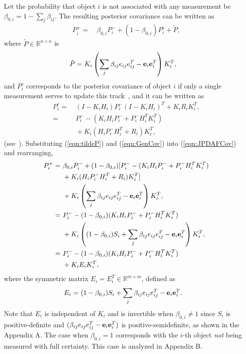 \documentclass[letterpaper, 10pt, conference]{ieeeconf}
\newcommand{\refeqn}[1]{(\ref{eqn:#1})}
\renewcommand{\Re}{\ensuremath{\mathbb{R}}}
\begin{document}
Let the probability that object $i$ is not associated with any measurement be $\beta_{0,i}=1-{\sum\limits_{j} \beta_{ij}}$.
The resulting posterior covariance can be written as
\begin{align}
\label{eqn:JPDAFCov}
P^+_{i}=&\ \beta_{0,i}P^-_{i}+(1-\beta_{0,i})P_i^c+\tilde P,
\end{align}
where $\tilde P\in\Re^{n\times n}$ is
\begin{align}
\tilde P=&\ K_i\left({\sum\limits_{j} \beta_{ij}e_{ij}e_{ij}^T-{\bf{e}}_{i}}{\bf{e}}_{i}^T\right)K_{i}^T,\label{eqn:tildeP}
\end{align}
and $P_i^c$ corresponds to the posterior covariance of object $i$ if only a single measurement serves to update this track~\cite{TrackDataAssoc}, and it can be written as
\begin{align}
P^c_i=&\ (I-K_iH_i)P^-_i(I-K_iH_i)^T+K_iR_iK_i^T,\nonumber
\\
=&\ P^-_i-(K_iH_iP^-_i+P^-_iH_i^TK_i^T)\nonumber
\\
&\ +K_i(H_iP^-_iH_i^T+R_i)K_i^T,
\label{eqn:GenCov}
\end{align}
(see~\cite{OptEst1}).
Substituting \refeqn{tildeP} and \refeqn{GenCov} into \refeqn{JPDAFCov} and rearranging,
\begin{align}
P^+_{i}=&\ \beta_{0,i}P^-_{i}+(1-\beta_{0,i})[P^-_i-(K_iH_iP^-_i+P^-_iH_i^TK_i^T)\nonumber
\\
&\ +K_i(H_iP^-_iH_i^T+R_i)K_i^T]\nonumber
\\
&\ +K_i\left({\sum\limits_{j} \beta_{ij}e_{ij}e_{ij}^T-{\bf{e}}_{i}}{\bf{e}}_{i}^T\right)K_{i}^T,\nonumber
\\
=&\ P^-_{i}-(1-\beta_{0,i})(K_iH_iP^-_i+P^-_iH_i^TK_i^T)\nonumber
\\
&\ +K_i\left((1-\beta_{0,i})S_i+{\sum\limits_{j} \beta_{ij}e_{ij}e_{ij}^T-{\bf{e}}_{i}}{\bf{e}}_{i}^T\right)K_i^T,\nonumber
\\
=&\ P^-_{i}-(1-\beta_{0,i})(K_iH_iP^-_i+P^-_iH_i^TK_i^T)\nonumber
\\
&\ +K_iE_iK_i^T,\label{eqn:CovExpanded}
\end{align}
where the symmetric matrix $E_i=E_i^T\in\Re^{m\times m}$, defined as
\begin{align}
E_i=&\ (1-\beta_{0,i})S_i+{\sum\limits_{j} \beta_{ij}e_{ij}e_{ij}^T-{\bf{e}}_{i}}{\bf{e}}_{i}^T.
\end{align}
Note that $E_i$ is independent of $K_i$ and is invertible when $\beta_{0,i}\neq1$ since $S_i$ is positive-definite and
$(\beta_{ij}e_{ij}e_{ij}^T-{\bf{e}}_{i}{\bf{e}}_{i}^T)$ is positive-semidefinite, as shown in the Appendix A. 
The case when $\beta_{0,i}=1$ corresponds with the $i$-th object \emph{not} being measured with full certainty.
This case is analyzed in Appendix B.
\end{document}
